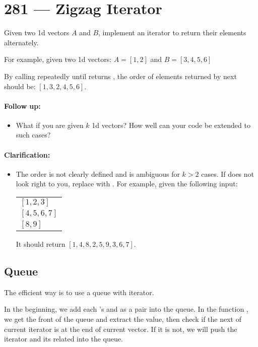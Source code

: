 \section{281 --- Zigzag Iterator}
Given two 1d vectors $A$ and $B$, implement an iterator to return their elements alternately.
\par
For example, given two 1d vectors:
$A = [1, 2]$ and $B = [3, 4, 5, 6]$
\par
By calling  repeatedly until  returns , the order of elements returned by next should be: $[1, 3, 2, 4, 5, 6]$.
\paragraph{Follow up:}
\begin{itemize}
    \item What if you are given $k$ 1d vectors? How well can your code be extended to such cases?
\end{itemize}

\paragraph{Clarification:}
\begin{itemize}
    \item The  order is not clearly defined and is ambiguous for $k > 2$ cases. If  does not look right to you, replace  with . For example, given the following input:
\begin{table}[H]
    \begin{tabular}{l}
        $[1,2,3]$   \\
        $[4,5,6,7]$ \\
        $[8,9]$
    \end{tabular}
\end{table}
It should return $[1,4,8,2,5,9,3,6,7]$.
\end{itemize}
\subsection{Queue}
The efficient way is to use a queue with iterator. 

In the beginning, we add each 's  and  as a pair into the queue. In the function , we get the front of the queue and extract the value, then check if the next of current iterator is at the end of current vector. If it is not, we will push the iterator and its related  into the queue.

